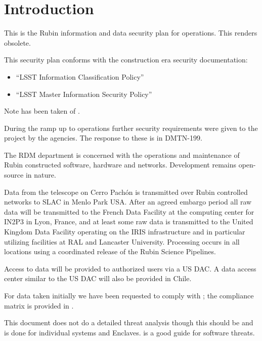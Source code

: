 

\section{Introduction}
This is the Rubin information and data security plan for operations.
This renders  obsolete.

This security plan conforms with the construction era security documentation:
\begin{itemize}
\item “LSST Information Classification Policy” 
\item “LSST Master Information Security Policy” 
\end{itemize}

Note has been taken of \cite{TCISSG}.

During the ramp up to operations further security requirements were given to the project by the agencies.
The response to these is in \gls{DMTN}-199.

The \gls{RDM} department is concerned with the operations and maintenance  of Rubin constructed software, hardware and networks.
Development remains open-source in nature.

Data from the telescope on Cerro Pach\'{o}n is transmitted over Rubin controlled networks to \gls{SLAC} in  Menlo Park USA.
After an agreed embargo period all raw data will be transmitted to the French Data Facility at the computing center for \gls{IN2P3} in Lyon, France, and at least some raw data is transmitted to the United Kingdom Data Facility operating on the IRIS infrastructure and in particular utilizing facilities at \gls{RAL} and Lancaster University.
Processing occurs in all locations using a coordinated release of the Rubin \gls{Science Pipelines}.

Access to data will be provided to authorized  users via a US \gls{DAC}.
A data access center similar to the \gls{US} \gls{DAC} will also be provided in Chile.

For data taken initially we have been requested to comply with ; the compliance matrix is provided in  .


This document does not do a detailed threat analysis though this should be and is done for individual systems and \gls{Enclave}s. \cite{TCISSG} is a good guide for software threats.







